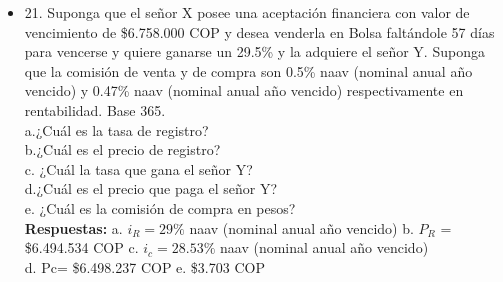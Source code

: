 \begin{itemize}
 \item 21. Suponga que el señor X posee una aceptación financiera con valor de vencimiento de \$6.758.000 COP y desea venderla en Bolsa faltándole 57 días para vencerse y quiere ganarse un 29.5\% y la adquiere el señor Y. Suponga que la comisión de venta y de compra son 0.5\% naav (nominal anual año vencido) y 0.47\% naav (nominal anual año vencido) respectivamente en rentabilidad. Base 365.\\
       a.¿Cuál es la tasa de registro?\\
       b.¿Cuál es el precio de registro?\\
       c. ¿Cuál la tasa que gana el señor Y?\\
       d.¿Cuál es el precio que paga el señor Y?\\
       e. ¿Cuál es la comisión de compra en pesos?\\
       \textbf{Respuestas:} a. $i_{R}= 29\%$ naav (nominal anual año vencido)\hspace{0,5cm} b. $P_{R}$ = \$6.494.534 COP\hspace{0,5cm}  c. $i_{c} = 28.53\%$ naav (nominal anual año vencido)\hspace{0,5cm}\\
       d. Pc= \$6.498.237 COP \hspace{0,5cm} e. \$3.703 COP\\
       \medskip


\end{itemize}
